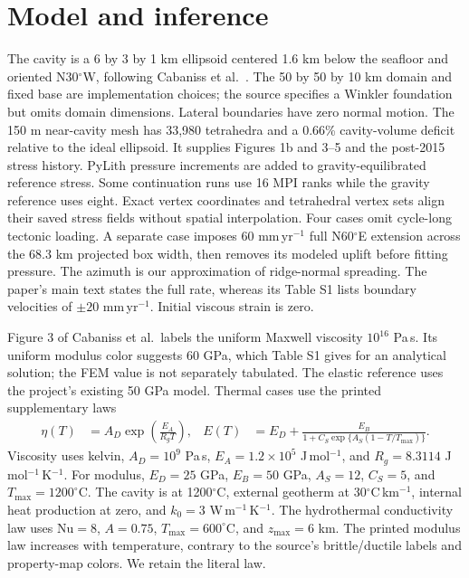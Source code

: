 \documentclass[10pt]{article}
\begin{document}
\section{Model and inference}
The cavity is a 6 by 3 by 1 km ellipsoid centered 1.6 km below the seafloor
and oriented N30$^\circ$W, following Cabaniss et al.\ \cite{cabaniss2020}.
The 50 by 50 by 10 km domain and fixed base are implementation choices;
the source specifies a Winkler foundation but omits domain dimensions.
Lateral boundaries have zero normal motion. The 150 m near-cavity mesh has
33,980 tetrahedra and a 0.66\% cavity-volume deficit relative to the ideal
ellipsoid. It supplies Figures 1b and 3--5 and the post-2015 stress history.
PyLith pressure increments are added to gravity-equilibrated reference stress.
Some continuation runs use 16 MPI ranks while the gravity reference uses eight.
Exact vertex coordinates and tetrahedral vertex sets align their saved stress
fields without spatial interpolation. Four cases omit cycle-long tectonic
loading. A separate
case imposes 60 mm\,yr$^{-1}$ full N60$^\circ$E extension across the 68.3 km
projected box width, then removes its modeled uplift before fitting pressure.
The azimuth is our approximation of ridge-normal spreading. The paper's main
text states the full rate, whereas its Table S1 lists boundary velocities of
$\pm20$ mm\,yr$^{-1}$. Initial viscous strain is zero.

Figure 3 of Cabaniss et al.\ labels the uniform Maxwell viscosity
$10^{16}$ Pa\,s. Its uniform modulus color suggests 60 GPa, which Table S1
gives for an analytical solution; the FEM value is not separately tabulated.
The elastic reference uses the project's existing 50 GPa model. Thermal
cases use the printed supplementary laws
\begin{align}
 \eta(T)&=A_D\exp\left(\frac{E_A}{R_gT}\right),&
 E(T)&=E_D+\frac{E_B}{1+C_S\exp\{A_S(1-T/T_{\max})\}} .
\end{align}
Viscosity uses kelvin, $A_D=10^9$ Pa\,s, $E_A=1.2\times10^5$
J\,mol$^{-1}$, and $R_g=8.3114$ J\,mol$^{-1}$\,K$^{-1}$.
For modulus, $E_D=25$ GPa, $E_B=50$ GPa, $A_S=12$, $C_S=5$,
and $T_{\max}=1200^\circ$C.
The cavity is at 1200$^\circ$C, external geotherm at
30$^\circ$C\,km$^{-1}$, internal heat production at zero, and
$k_0=3$ W\,m$^{-1}$\,K$^{-1}$. The hydrothermal conductivity law
uses Nu$=8$, $A=0.75$, $T_{\max}=600^\circ$C, and $z_{\max}=6$ km.
The printed modulus law increases with temperature, contrary to the source's
brittle/ductile labels and property-map colors. We retain the literal law.
\end{document}

